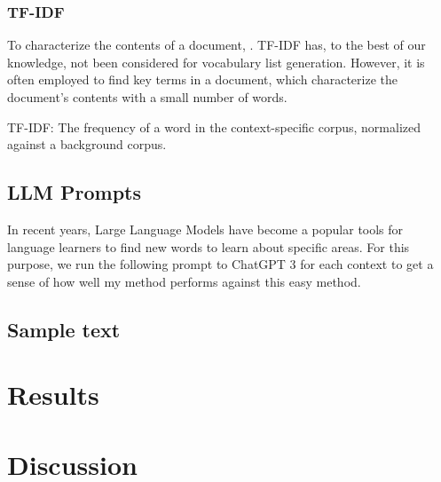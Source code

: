 \subsubsection{TF-IDF}
To characterize the contents of a document, \cite{qaiserTextMiningUse2018}.
TF-IDF has, to the best of our knowledge, not been considered for vocabulary list generation.
However, it is often employed to find key terms in a document, which characterize the document's contents with a small number of words.

TF-IDF: The frequency of a word in the context-specific corpus, normalized against a background corpus.

\subsection{LLM Prompts}
In recent years, Large Language Models have become a popular tools for language learners to find new words to learn about specific areas.
For this purpose, we run the following prompt to ChatGPT 3 for each context to get a sense of how well my method performs against this easy method.

\subsection{Sample text}


\section{Results} \label{sec:results}

\section{Discussion}

